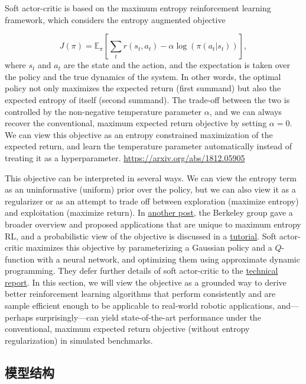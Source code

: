 Soft actor-critic is based on the maximum entropy reinforcement learning 
framework, which considers the entropy augmented objective

\begin{equation}\label{sac_entropy_augmented_objective}
J(\pi) = \mathbb{E}_\pi\left[
\sum_tr(s_t, a_t) - \alpha \log\left(\pi(a_t | s_t)\right)
\right],
\end{equation}
\noindent{}where $s_t$ and $a_t$ are the state and the action, and the 
expectation is taken over the policy and the true dynamics of the system. 
In other words, the optimal policy not only maximizes the expected return 
(first summand) but also the expected entropy of itself (second summand). 
The trade-off between the two is controlled by the non-negative temperature 
parameter $\alpha$, and we can always recover the conventional, maximum 
expected return objective by setting $\alpha=0$. We can view this objective 
as an entropy constrained maximization of the expected return, and learn 
the temperature parameter automatically instead of treating it as a 
hyperparameter. 
\url{https://arxiv.org/abs/1812.05905}

This objective can be interpreted in several ways. We can view the entropy 
term as an uninformative (uniform) prior over the policy, but we can also 
view it as a regularizer or as an attempt to trade off between exploration 
(maximize entropy) and exploitation (maximize return). In 
\href{https://bair.berkeley.edu/blog/2017/10/06/soft-q-learning/}{another post}, 
the Berkeley group gave a broader overview and proposed applications that are 
unique to maximum entropy RL, and a probabilistic view of the objective is 
discussed in a \href{https://arxiv.org/abs/1805.00909}{tutorial}. 
Soft actor-critic maximizes this objective by parameterizing a Gaussian policy 
and a $Q$-function with a neural network, and optimizing them using approximate 
dynamic programming. They defer further details of soft actor-critic to the 
\href{https://arxiv.org/abs/1812.05905}{technical report}. In this section, 
we will view the objective as a grounded way to derive better reinforcement 
learning algorithms that perform consistently and are sample efficient enough 
to be applicable to real-world robotic applications, and—perhaps surprisingly—can 
yield state-of-the-art performance under the conventional, maximum expected 
return objective (without entropy regularization) in simulated benchmarks.


\subsection{模型结构}

